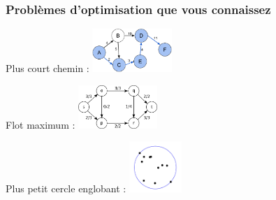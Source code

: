 \documentclass{beamer}
\begin{document}
\begin{frame}
  \frametitle{Problèmes d'optimisation que vous connaissez}

  \begin{block}{Plus court chemin : }
    \centering
    \includegraphics[width=3cm]{shortest-path.png}
  \end{block}

  \begin{block}{Flot maximum : }
    \centering
    \includegraphics[width=3cm]{max-flow.png}
  \end{block}
  
  \begin{block}{Plus petit cercle englobant : }
    \centering
    \includegraphics[width=2cm]{seb.png}
  \end{block}
  
\end{frame}
\end{document}
